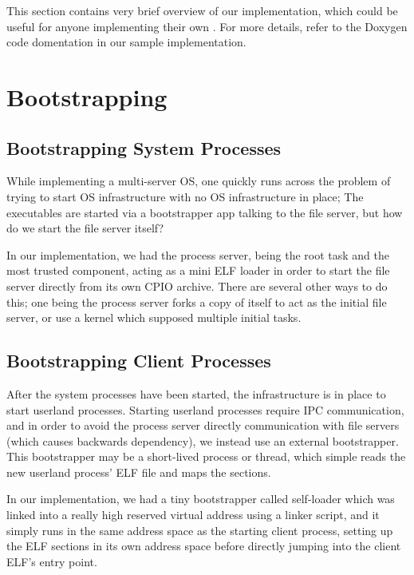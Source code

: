 %
%
%
%

This section contains very brief overview of our implementation, which could be useful for anyone
implementing their own . For more details, refer to the Doxygen code domentation in our sample
implementation.

\section{Bootstrapping}

\subsection*{Bootstrapping System Processes}
While implementing a multi-server OS, one quickly runs across the problem of trying to start
OS infrastructure with no OS infrastructure in place; The executables are started via a
bootstrapper app talking to the file server, but how do we start the file server itself?

In our implementation, we had the process server, being the root task and the most trusted
component, acting as a mini ELF loader in order to start the file server directly from its own CPIO
archive. There are several other ways to do this; one being the process server forks a copy of 
itself to act as the initial file server, or use a kernel which supposed multiple initial
tasks.

\subsection*{Bootstrapping Client Processes}
After the system processes have been started, the infrastructure is in place to start userland
processes. Starting userland processes require IPC communication, and in order to avoid the process
server directly communication with file servers (which causes backwards dependency), we instead
use an external bootstrapper. This bootstrapper may be a short-lived process or thread, which
simple reads the new userland process' ELF file and maps the sections.

In our implementation, we had a tiny bootstrapper called self-loader which was linked into a really
high reserved virtual address using a linker script, and it simply runs in the same address space as
the starting client process, setting up the ELF sections in its own address space before directly
jumping into the client ELF's entry point.

